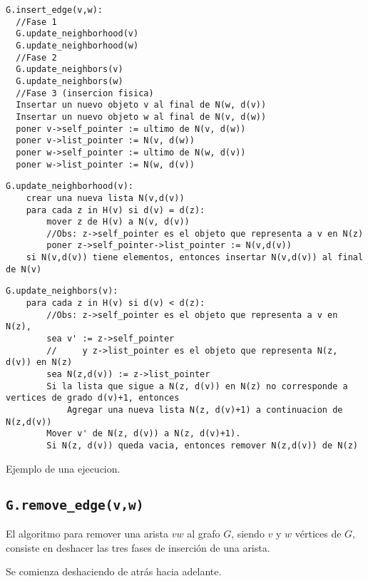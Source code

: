 \documentclass[a4paper,12pt]{article}
\begin{document}
\begin{lstlisting}
G.insert_edge(v,w):
  //Fase 1
  G.update_neighborhood(v)
  G.update_neighborhood(w)
  //Fase 2
  G.update_neighbors(v)
  G.update_neighbors(w)
  //Fase 3 (insercion fisica)
  Insertar un nuevo objeto v al final de N(w, d(v))
  Insertar un nuevo objeto w al final de N(v, d(w))
  poner v->self_pointer := ultimo de N(v, d(w))
  poner v->list_pointer := N(v, d(w))
  poner w->self_pointer := ultimo de N(w, d(v))
  poner w->list_pointer := N(w, d(v))
\end{lstlisting}

\begin{lstlisting}
G.update_neighborhood(v):
    crear una nueva lista N(v,d(v))
    para cada z in H(v) si d(v) = d(z):
        mover z de H(v) a N(v, d(v))
        //Obs: z->self_pointer es el objeto que representa a v en N(z)
        poner z->self_pointer->list_pointer := N(v,d(v))
    si N(v,d(v)) tiene elementos, entonces insertar N(v,d(v)) al final de N(v) 
\end{lstlisting}

\begin{lstlisting}
G.update_neighbors(v):
    para cada z in H(v) si d(v) < d(z):
        //Obs: z->self_pointer es el objeto que representa a v en N(z),
        sea v' := z->self_pointer
        //     y z->list_pointer es el objeto que representa N(z, d(v)) en N(z)
        sea N(z,d(v)) := z->list_pointer
        Si la lista que sigue a N(z, d(v)) en N(z) no corresponde a vertices de grado d(v)+1, entonces
            Agregar una nueva lista N(z, d(v)+1) a continuacion de N(z,d(v))
        Mover v' de N(z, d(v)) a N(z, d(v)+1).
        Si N(z, d(v)) queda vacia, entonces remover N(z,d(v)) de N(z)
\end{lstlisting}

Ejemplo de una ejecucion.

\subsection{\texttt{G.remove\_edge(v,w)}}

El algoritmo para remover una arista $vw$ al grafo $G$, siendo $v$ y $w$ vértices de $G$, consiste en deshacer las tres fases de inserción de una arista.

Se comienza deshaciendo de atrás hacia adelante.
\end{document}
